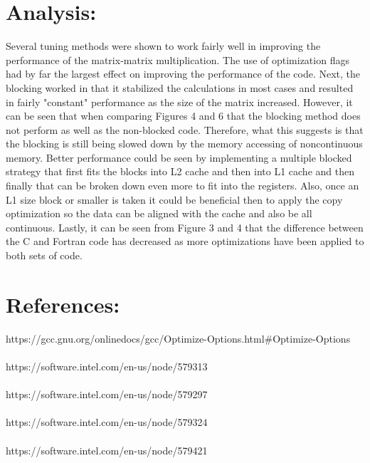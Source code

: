 \documentclass{article}
\begin{document}
\section*{Analysis:}

Several tuning methods were shown to work fairly well in improving the performance of the matrix-matrix multiplication. The use of optimization flags had by far the largest effect on improving the performance of the code. Next, the blocking worked in that it stabilized the calculations in most cases and resulted in fairly "constant" performance as the size of the matrix increased. However, it can be seen that when comparing Figures 4 and 6 that the blocking method does not perform as well as the non-blocked code. Therefore, what this suggests is that the blocking is still being slowed down by the memory accessing of noncontinuous memory. Better performance could be seen by implementing a multiple blocked strategy that first fits the blocks into L2 cache and then into L1 cache and then finally that can be broken down even more to fit into the registers. Also, once an L1 size block or smaller is taken it could be beneficial then to apply the copy optimization so the data can be aligned with the cache and also be all continuous. Lastly, it can be seen from Figure 3 and 4 that the difference between the C and Fortran code has decreased as more optimizations have been applied to both sets of code.

\section*{References:}

\noindent [1]  https://gcc.gnu.org/onlinedocs/gcc/Optimize-Options.html\#Optimize-Options \\  \\
\noindent [2] https://software.intel.com/en-us/node/579313 \\ \\
\noindent [3] https://software.intel.com/en-us/node/579297 \\ \\
\noindent [4] https://software.intel.com/en-us/node/579324 \\ \\
\noindent [5] https://software.intel.com/en-us/node/579421 \\ \\
\end{document}
